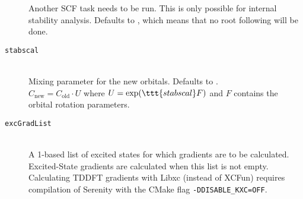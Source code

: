 \begin{description}
    Another SCF task needs to be run. This is only possible for internal stability analysis.
    Defaults to , which means that no root following will be done.
    \item [\texttt{stabscal}]\hfill \\
    Mixing parameter for the new orbitals. Defaults to .\\
    $C_\mathrm{new} = C_\mathrm{old} \cdot U $ where $U=\mathrm{exp}(\ttt{stabscal} F)$ and $F$ contains the orbital rotation parameters.
    \item[\texttt{excGradList}]\hfill \\
    A 1-based list of excited states for which gradients are to be calculated. Excited-State gradients are calculated when this list is not empty.
    Calculating TDDFT gradients with Libxc (instead of XCFun) requires compilation of Serenity with the CMake flag \texttt{-DDISABLE\_KXC=OFF}.
    \end{description}
